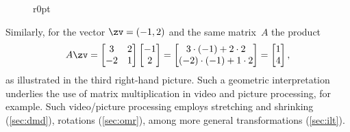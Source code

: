 \begin{figure}r{0pt}
\end{figure}
Similarly, for the vector \(\zv=(-1,2)\) and the same matrix~\(A\) the product
\begin{equation*}
A\zv=\begin{bmatrix} 3 & 2\\ -2 & 1 \end{bmatrix}
\begin{bmatrix} -1\\2 \end{bmatrix}
=\begin{bmatrix} 3\cdot(-1)+2\cdot2\\ (-2)\cdot(-1)+1\cdot2 \end{bmatrix}
=\begin{bmatrix} 1\\ 4 \end{bmatrix},
\end{equation*}
as illustrated in the third right-hand picture.
Such a geometric interpretation underlies the use of matrix multiplication in video and picture processing, for example.
Such video\slash picture processing employs stretching and shrinking (\cref{sec:dmd}), rotations (\cref{sec:omr}), among more general transformations (\cref{sec:ilt}).


